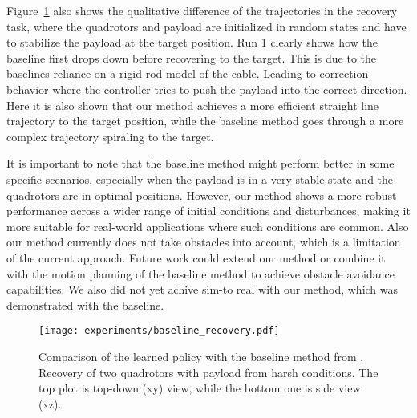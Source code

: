 Figure~\ref{fig:baseline_recovery} also shows the qualitative difference of the trajectories in the recovery task, where the quadrotors and payload are initialized in random states and have to stabilize the payload at the target position. Run 1 clearly shows how the baseline first drops down before recovering to the target. This is due to the baselines reliance on a rigid rod model of the cable. Leading to correction behavior where the controller tries to push the payload into the correct direction. Here it is also shown that our method achieves a more efficient straight line trajectory to the target position, while the baseline method goes through a more complex trajectory spiraling to the target.

It is important to note that the baseline method might perform better in some specific scenarios, especially when the payload is in a very stable state and the quadrotors are in optimal positions. However, our method shows a more robust performance across a wider range of initial conditions and disturbances, making it more suitable for real-world applications where such conditions are common. Also our method currently does not take obstacles into account, which is a limitation of the current approach. Future work could extend our method or combine it with the motion planning of the baseline method to achieve obstacle avoidance capabilities. We also did not yet achive sim-to real with our method, which was demonstrated with the baseline.

\begin{figure}[H]
    \centering
    
    \texttt{[image: experiments/baseline\_recovery.pdf]}
    \caption[Baseline vs Learned Two Quadrotor Recovery]{Comparison of the learned policy with the baseline method from \autocite{Wahba2024}. Recovery of two quadrotors with payload from harsh conditions. The top plot is top-down  (xy) view, while the bottom one is side view (xz).}
    \label{fig:baseline_recovery}
\end{figure}


